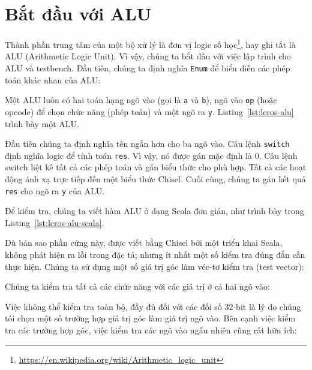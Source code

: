 \documentclass[%
    10pt,
    headinclude, footexclude,
    openright, %
    notitlepage,
    cleardoubleempty,
    headsepline,
    pointlessnumbers,
    bibtotoc, idxtotoc,
    ]{scrbook}
\newcommand{\code}[1]{{\small{\texttt{#1}}}}
\newcommand{\todo}[1]{{\emph{TODO: #1}}}
\newcommand{\myref}[2]{\href{#1}{#2}}
\renewcommand{\myref}[2]{{#2}{\footnote{\url{#1}}}}
\renewcommand{\todo}[1]{}
\begin{document}
\section{Bắt đầu với ALU}


Thành phần trung tâm của một bộ xử lý là \myref{https://en.wikipedia.org/wiki/Arithmetic_logic_unit}{đơn vị logic số học}, hay ghi tắt là ALU (Arithmetic Logic Unit). Vì vậy, chúng ta bắt đầu với việc lập trình cho ALU và testbench. Đầu tiên, chúng ta định nghĩa \code{Enum} để biểu diễn các phép toán khác nhau của ALU:


\noindent Một ALU luôn có hai toán hạng ngõ vào (gọi là \code{a} và \code{b}), ngõ vào \code{op} (hoặc opcode) để chọn chức năng (phép toán) và một ngõ ra \code{y}. Listing~\ref{lst:leros-alu} trình bày một ALU.

\todo{draw a nice ALU, see Wikipedia}

Đầu tiên chúng ta định nghĩa tên ngắn hơn cho ba ngõ vào. Câu lệnh \code{switch} định nghĩa logic để tính toán \code{res}. Vì vậy, nó được gán mặc định là 0. Câu lệnh switch liệt kê tất cả các phép toán và gán biểu thức cho phù hợp. Tất cả các hoạt động ánh xạ trực tiếp đến một biểu thức Chisel. Cuối cùng, chúng ta gán kết quả \code{res} cho ngõ ra \code{y} của ALU.


Để kiểm tra, chúng ta viết hàm ALU ở dạng Scala đơn giản, như trình bày trong Listing~\ref{lst:leros-alu-scala}.


\noindent Dù bản sao phần cứng này, được viết bằng Chisel bởi một triển khai Scala, không phát hiện ra lỗi trong đặc tả; nhưng ít nhất một số kiểm tra đúng đắn cần thực hiện. Chúng ta sử dụng một số giá trị góc làm véc-tơ kiểm tra (test vector): 


\noindent Chúng ta kiểm tra tất cả các chức năng với các giá trị ở cả hai ngõ vào:


\noindent Việc không thể kiểm tra toàn bộ, đầy đủ đối với các đối số 32-bit là lý do chúng tôi chọn một số trường hợp giá trị góc làm giá trị ngõ vào. Bên cạnh việc kiểm tra các trường hợp góc, việc kiểm tra các ngõ vào ngẫu nhiên cũng rất hữu ích: 
\end{document}
